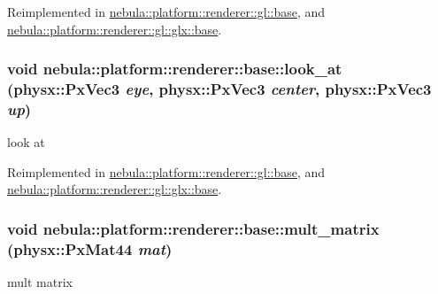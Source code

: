 Reimplemented in \hyperlink{classnebula_1_1platform_1_1renderer_1_1gl_1_1base_a05d47dc08e518dca1f1f6940dd25b1d4}{nebula::platform::renderer::gl::base}, and \hyperlink{classnebula_1_1platform_1_1renderer_1_1gl_1_1glx_1_1base_a111905577043b961ebf0f7111e8ec998}{nebula::platform::renderer::gl::glx::base}.\hypertarget{classnebula_1_1platform_1_1renderer_1_1base_a178cbf87e4677f7efaf44ce5de29a580}{
\subsubsection[{look\_\-at}]{\setlength{\rightskip}{0pt plus 5cm}void nebula::platform::renderer::base::look\_\-at (physx::PxVec3 {\em eye}, \/  physx::PxVec3 {\em center}, \/  physx::PxVec3 {\em up})}}
\label{classnebula_1_1platform_1_1renderer_1_1base_a178cbf87e4677f7efaf44ce5de29a580}


look at 

Reimplemented in \hyperlink{classnebula_1_1platform_1_1renderer_1_1gl_1_1base_a9409d2f85fd5b8ceb9aa159f557a77c4}{nebula::platform::renderer::gl::base}, and \hyperlink{classnebula_1_1platform_1_1renderer_1_1gl_1_1glx_1_1base_ac1e401ba57d7b5a09ba684529092ea38}{nebula::platform::renderer::gl::glx::base}.\hypertarget{classnebula_1_1platform_1_1renderer_1_1base_a42be4fa519953220e66cebbc5d56ec31}{
\subsubsection[{mult\_\-matrix}]{\setlength{\rightskip}{0pt plus 5cm}void nebula::platform::renderer::base::mult\_\-matrix (physx::PxMat44 {\em mat})}}
\label{classnebula_1_1platform_1_1renderer_1_1base_a42be4fa519953220e66cebbc5d56ec31}


mult matrix 

